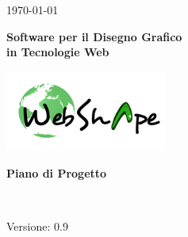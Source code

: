 \usepackage{multirow}
\title{\TITOLODOC}
\author{Dal Bosco Davide}



\renewcommand{\insertversion}{0.9} %
\renewcommand{\TITOLODOC}{Piano di Progetto} %
\renewcommand{\glosspath}{.\glossario} %

\begin{titlepage}
\begin{center}
	\begin{Large}	\today \end{Large}
\end{center}

\vspace{20pt}

\begin{center}
	\begin{Huge}
				\textbf{\ajax}
	\end{Huge}
\end{center}			

\begin{center}
	\begin{large}
				\textbf{Software per il Disegno Grafico\\ in Tecnologie Web}
	\end{large}
\end{center}			

\vspace{20pt}

\begin{center}
\includegraphics[width=150pt]{../logo/logo}
\end{center}

\vspace{170pt}
\begin{center} %
	\begin{Huge}
				\textbf{\TITOLODOC}
	\end{Huge}
			\\
\end{center}
\vspace{210pt}
\begin{center}
Versione: \insertversion
\end{center}
\end{titlepage}

